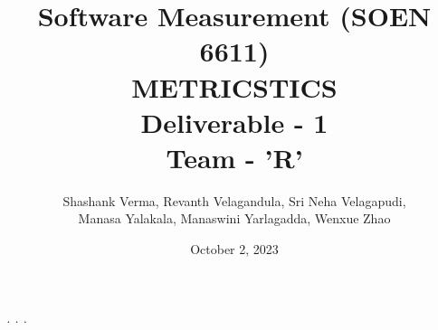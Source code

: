\documentclass[letterpaper]{report}
\title{Software Measurement (SOEN 6611)\\[.5em]
METRICSTICS\\[.5em]
Deliverable - 1\\[.5em]
Team - 'R'\\[.5em]}
\author{Shashank Verma, Revanth Velagandula, Sri Neha Velagapudi, \\[.5em]
Manasa Yalakala, Manaswini Yarlagadda, Wenxue Zhao\\[.5em]}
\date{October 2, 2023\\[.5em]}
\begin{document}
\maketitle

\tableofcontents
\listoffigures
\listoftables

% 

\begin{thebibliography}{. . .}

\textit{. . .}

\end{thebibliography}
\end{document}
